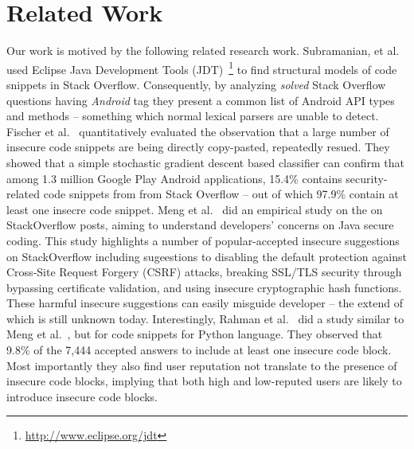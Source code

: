 \section{Related Work}
\label{sec:related-work}
Our work is motived by the following related research work. 
Subramanian, et al.~\cite{subramanian2013making} used Eclipse Java Development Tools (JDT)~\footnote{\url{http://www.eclipse.org/jdt}}  
to find structural models of code snippets in Stack Overflow. Consequently, by analyzing \textit{solved} Stack Overflow questions having \textit{Android} tag they present a common list of Android API types and methods -- something which normal lexical parsers are unable to detect. 
Fischer et al.~\cite{fischer2017stack}  quantitatively evaluated the observation that a large number of insecure code snippets are being directly copy-pasted, repeatedly resued. They showed that a simple stochastic gradient descent based classifier can confirm that among 1.3 million Google Play Android applications, 15.4\% contains security-related code snippets from  from Stack Overflow -- out of which 97.9\% contain at least one insecre code snippet. 
Meng et al.~\cite{meng2018secure} did an empirical study on the on StackOverflow posts, aiming to understand developers’ concerns on Java secure coding. This study highlights a number of popular-accepted insecure suggestions on  StackOverflow including sugeestions to disabling the default protection against Cross-Site Request Forgery (CSRF) attacks, breaking SSL/TLS security through bypassing certificate validation, and using insecure cryptographic hash functions. These harmful insecure suggestions can easily misguide developer -- the extend of which is still unknown today. 
Interestingly, Rahman et al.~\cite{akondsnakes} did a study similar to Meng et al.~\cite{meng2018secure}, but for code snippets for Python language. They observed that 9.8\% of the 7,444 accepted answers to include at least one insecure code block. Most importantly they also find user reputation not
translate to the presence of insecure code blocks, implying  that both high and low-reputed users are likely to introduce insecure code blocks. 


